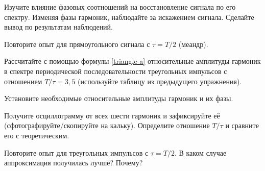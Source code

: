 \begin{lab:task}
\item Изучите влияние фазовых соотношений на восстановление сигнала по
его спектру. Изменяя фазы гармоник, наблюдайте за искажением сигнала.
Сделайте вывод по результатам наблюдений.

\item Повторите опыт для прямоугольного сигнала с $\tau=T/2$ (меандр).


	\item Рассчитайте с помощью формулы \eqref{triangle-a} относительные
амплитуды гармоник в спектре периодической последовательности треугольных
импульсов с отношением $T/\tau=3,5$ (используйте таблицу из предыдущего
упражнения).
	\item Установите необходимые относительные амплитуды гармоник и их фазы.
	\item Получите осциллограмму от всех шести гармоник и
зафиксируйте её (сфотографируйте/скопируйте на кальку).
Определите отношение $T/\tau$ и сравните его с теоретическим.
        \item Повторите опыт для треугольных импульсов с $\tau=T/2$. В каком
случае аппроксимация получилась лучше? Почему?

%
%
%
%

\end{lab:task}





